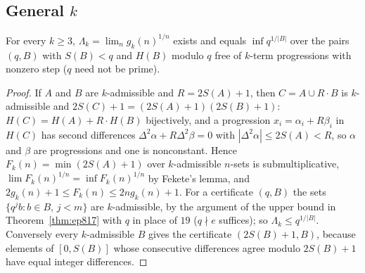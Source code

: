\subsection{General \texorpdfstring{$k$}{k}}

\begin{theorem}[EP-04]\label{thm:genk}
For every $k\ge3$, $\Lambda_k=\lim_ng_k(n)^{1/n}$ exists and equals $\inf q^{1/|B|}$ over the pairs $(q,B)$ with $S(B)<q$ and $H(B)$ modulo $q$ free of $k$-term progressions with nonzero step ($q$ need not be prime).
\end{theorem}
\begin{proof}
If $A$ and $B$ are $k$-admissible and $R=2S(A)+1$, then $C=A\cup R\cdot B$ is $k$-admissible and $2S(C)+1=(2S(A)+1)(2S(B)+1)$: $H(C)=H(A)+R\cdot H(B)$ bijectively, and a progression $x_i=\alpha_i+R\beta_i$ in $H(C)$ has second differences $\Delta^2\alpha+R\Delta^2\beta=0$ with $|\Delta^2\alpha|\le2S(A)<R$, so $\alpha$ and $\beta$ are progressions and one is nonconstant. Hence $F_k(n)=\min(2S(A)+1)$ over $k$-admissible $n$-sets is submultiplicative, $\lim F_k(n)^{1/n}=\inf F_k(n)^{1/n}$ by Fekete's lemma, and $2g_k(n)+1\le F_k(n)\le2ng_k(n)+1$. For a certificate $(q,B)$ the sets $\{q^jb:b\in B,\,j<m\}$ are $k$-admissible, by the argument of the upper bound in Theorem~\ref{thm:ep817} with $q$ in place of $19$ ($q\nmid e$ suffices); so $\Lambda_k\le q^{1/|B|}$. Conversely every $k$-admissible $B$ gives the certificate $(2S(B)+1,B)$, because elements of $[0,S(B)]$ whose consecutive differences agree modulo $2S(B)+1$ have equal integer differences.
\end{proof}

